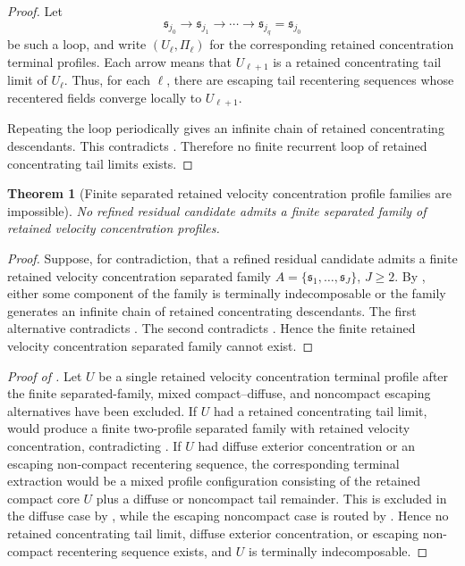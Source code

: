 \documentclass[11pt]{amsart}
\numberwithin{equation}{section}
\theoremstyle{plain}
\newtheorem{theorem}{Theorem}[section]
\theoremstyle{definition}
\theoremstyle{remark}
\begin{document}
\begin{proof}
Let
\[
   \mathfrak s_{j_0}\to\mathfrak s_{j_1}\to\cdots
   \to\mathfrak s_{j_q}=\mathfrak s_{j_0}
\]
be such a loop, and write \((U_\ell,\Pi_\ell)\) for the corresponding retained
concentration terminal profiles.  Each arrow means that \(U_{\ell+1}\) is a
retained concentrating tail limit of \(U_\ell\).  Thus, for each \(\ell\), there are escaping
tail recentering sequences whose recentered fields converge locally to \(U_{\ell+1}\).

Repeating the loop periodically gives an infinite chain of retained concentrating descendants.
This contradicts .  Therefore no finite
recurrent loop of retained concentrating tail limits exists.
\end{proof}

\begin{theorem}[Finite separated retained velocity concentration profile families are impossible]
\label{thm:no-finite-separated-profile-family}
No refined residual candidate admits a finite separated family of retained
velocity concentration profiles.
\end{theorem}

\begin{proof}
Suppose, for contradiction, that a refined residual candidate admits a finite
retained velocity concentration separated family \(A=\{\mathfrak s_1,\dots,\mathfrak s_J\}\),
\(J\ge2\).  By , either some component of the
family is terminally indecomposable or the family generates an infinite chain of
retained concentrating descendants.  The first alternative contradicts
.  The second contradicts
.  Hence the finite retained velocity
concentration separated family cannot exist.
\end{proof}

\begin{proof}[Proof of ]
Let \(U\) be a single retained velocity concentration terminal profile after the finite
separated-family, mixed compact--diffuse, and noncompact escaping alternatives
have been excluded.  If \(U\) had a retained concentrating tail limit,
 would produce a finite two-profile
separated family with retained velocity concentration, contradicting
.  If \(U\) had diffuse exterior
concentration or an escaping non-compact recentering sequence, the corresponding
terminal extraction would be a mixed profile configuration consisting of the
retained compact core \(U\) plus a diffuse or noncompact tail remainder.  This
is excluded in the diffuse case by , while
the escaping noncompact case is routed by
.  Hence no retained
concentrating tail limit, diffuse exterior concentration, or escaping
non-compact recentering sequence exists, and \(U\) is terminally
indecomposable.
\end{proof}
\end{document}
